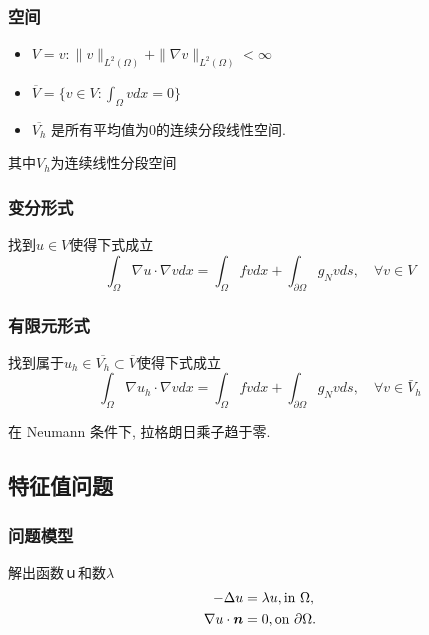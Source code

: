 \documentclass{article}
\begin{document}
\subsubsection{空间}
\begin{itemize}
	\item $V = {v:\|v\|_{L^{2}(\Omega)}+\|\nabla v\|_{L^{2}(\Omega)}<\infty}$
    \item $\overline{V}=\{v\in V:\int_{\Omega}vdx=0\}$
    \item $\overline{V_h}$ 是所有平均值为0的连续分段线性空间.
\end{itemize}
     其中$V_h$为连续线性分段空间
     
\subsubsection{变分形式}
找到$u \in V $使得下式成立
\begin{equation}
\int_{\Omega} \nabla u \cdot \nabla v d x=\int_{\Omega} f v d x+\int_{\partial \Omega} g_{N} v d s, \quad \forall v \in V
\end{equation}

\subsubsection{有限元形式}
找到属于$u_h\in\overline{V_h}\subset\overline{V}$使得下式成立
\begin{equation}
\int_{\Omega} \nabla u_{h} \cdot \nabla v d x=\int_{\Omega} f v d x+\int_{\partial \Omega} g_{N} v d s, \quad \forall v \in \bar{V}_{h}
\end{equation}

在 Neumann 条件下, 拉格朗日乘子趋于零.

\subsection{特征值问题}

\subsubsection{问题模型}
解出函数ｕ和数$\lambda$
\begin{equation}
    \begin{aligned}
        - \Delta u & = \lambda u, \text{in} \ \Omega, \\
        \nabla u \cdot {\boldsymbol n} & = 0, \text{on}\ \partial \Omega.
    \end{aligned}
\end{equation}
\end{document}

